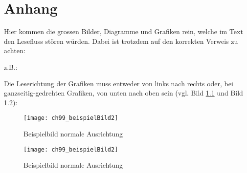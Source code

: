 \appendix
\chapter{Anhang}\label{ch:anhang}
Hier kommen die grossen Bilder, Diagramme und Grafiken rein, welche im Text den Lesefluss stören würden. Dabei ist trotzdem auf den korrekten Verweis zu achten:

z.B.: 

Die Leserichtung der Grafiken muss entweder von links nach rechts oder, bei ganzseitig-gedrehten Grafiken, von unten nach oben sein (vgl. Bild \ref{beispiel_abbildung2} und Bild \ref{beispiel_abbildung3}):
\begin{figure}[h]
    \centering
    \texttt{[image: ch99\_beispielBild2]}
    \caption{Beispielbild normale Ausrichtung}
    \label{beispiel_abbildung2}
\end{figure}

\begin{figure}[h]
    \centering
    \texttt{[image: ch99\_beispielBild2]}
    \caption{Beispielbild normale Ausrichtung}
    \label{beispiel_abbildung3}
\end{figure}

